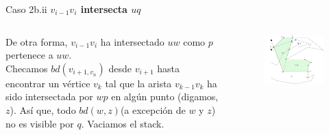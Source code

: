 \documentclass[aspectratio=169,xcolor=dvipsnames, t]{beamer}
\begin{document}
\begin{frame}{Caso 2b.ii}
    \textbf{$v_{i-1}v_{i}$ intersecta $uq$}\\
    \vspace{0.5cm}
    \begin{columns}
    \begin{column}{0.45\textwidth}
        De otra forma, $v_{i-1}v_{i}$ ha intersectado $uw$ como $p$ pertenece a $uw$.\\
        \vspace{0.5cm}
        Checamos $bd(v_{i+1, v_{n}})$ desde $v_{i+1}$ hasta encontrar un vértice $v_{k}$ tal que la arista $v_{k-1}v_{k}$ ha sido intersectada por $wp$ en algún punto (digamos, $z$). Así que, todo $bd(w,z)$(a excepción de $w$ y $z$) no es visible por $q$. Vaciamos el stack.\\
    \vspace{0.5cm}
    \end{column}
    \begin{column}{0.45\textwidth}  %
    \vspace{-2.5cm}
        \begin{figure}
            \centering
            \includegraphics[width=1\textwidth]{imagenes/Caso2.7b.png}
        \end{figure}
    \end{column}
    \end{columns}
\end{frame}
\end{document}

